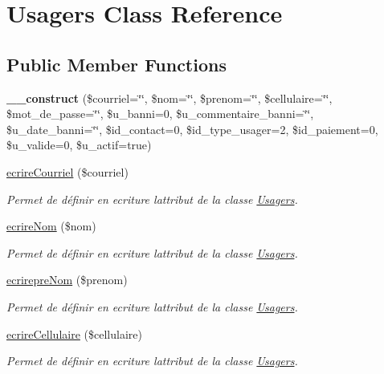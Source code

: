 \hypertarget{class_usagers}{}\section{Usagers Class Reference}
\label{class_usagers}
\subsection*{Public Member Functions}
\begin{DoxyCompactItemize}
\item 
\mbox{\label{class_usagers_a649a5d9bfaa0ce82ca980bb0d6d25eb9}} 
{\bfseries \+\_\+\+\_\+construct} (\$courriel=\char`\"{}\char`\"{}, \$nom=\char`\"{}\char`\"{}, \$prenom=\char`\"{}\char`\"{}, \$cellulaire=\char`\"{}\char`\"{}, \$mot\+\_\+de\+\_\+passe=\char`\"{}\char`\"{}, \$u\+\_\+banni=0, \$u\+\_\+commentaire\+\_\+banni=\char`\"{}\char`\"{}, \$u\+\_\+date\+\_\+banni=\char`\"{}\char`\"{}, \$id\+\_\+contact=0, \$id\+\_\+type\+\_\+usager=2, \$id\+\_\+paiement=0, \$u\+\_\+valide=0, \$u\+\_\+actif=true)
\item 
\hyperlink{class_usagers_ab93fa770c19fb41fe6fc22cf43bf2d8a}{ecrire\+Courriel} (\$courriel)
\begin{DoxyCompactList}\small\item\em Permet de définir en ecriture l\textquotesingle{}attribut de la classe \hyperlink{class_usagers}{Usagers}. \end{DoxyCompactList}\item 
\hyperlink{class_usagers_a0753020bb935547da5c00f81e41b8237}{ecrire\+Nom} (\$nom)
\begin{DoxyCompactList}\small\item\em Permet de définir en ecriture l\textquotesingle{}attribut de la classe \hyperlink{class_usagers}{Usagers}. \end{DoxyCompactList}\item 
\hyperlink{class_usagers_afa083ffdd8e53b32094469378b3ac1f0}{ecrirepre\+Nom} (\$prenom)
\begin{DoxyCompactList}\small\item\em Permet de définir en ecriture l\textquotesingle{}attribut de la classe \hyperlink{class_usagers}{Usagers}. \end{DoxyCompactList}\item 
\hyperlink{class_usagers_a9d555a378de66afd36db65608e43b0e2}{ecrire\+Cellulaire} (\$cellulaire)
\begin{DoxyCompactList}\small\item\em Permet de définir en ecriture l\textquotesingle{}attribut de la classe \hyperlink{class_usagers}{Usagers}. \end{DoxyCompactList}\item 

\end{DoxyCompactItemize}
